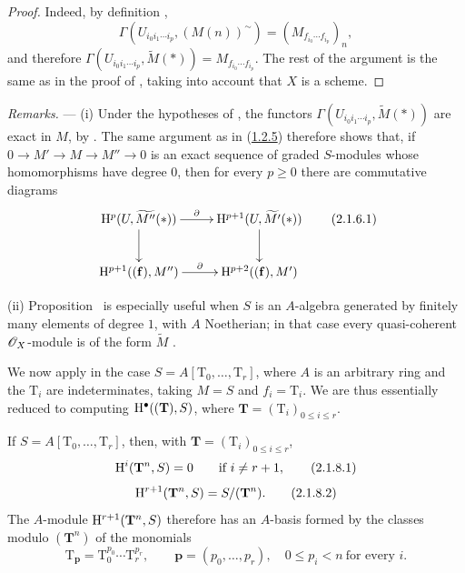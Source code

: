 \begin{proof}
Indeed, by definition ,
\[
  \Gamma(U_{i_0i_1\cdots i_p},(M(n))^\sim)
  =(M_{f_{i_0}\cdots f_{i_p}})_n,
\]
and therefore $\Gamma(U_{i_0i_1\cdots i_p},\widetilde{M}(*))=M_{f_{i_0}\cdots f_{i_p}}$.
The rest of the argument is the same as in the proof of , taking into account that $X$ is a scheme.
\end{proof}

\begin{env}[2.1.6]
\label{III.2.1.6}
\emph{Remarks.} ---
(i) Under the hypotheses of , the functors $\Gamma(U_{i_0i_1\cdots i_p},\widetilde{M}(*))$ are exact in $M$, by .
The same argument as in (\hyperref[III.1.2.5]{1.2.5}) therefore shows that, if $0\to M'\to M\to M''\to0$ is an exact sequence of graded $S$-modules whose homomorphisms have degree $0$, then for every $p\geq0$ there are commutative diagrams
\[
\label{III.2.1.6.1}
  \xymatrix{
    \HH^p(U,\widetilde{M''}(*)) \ar[r]^-\partial \ar[d] &
    \HH^{p+1}(U,\widetilde{M'}(*)) \ar[d] \\
    \HH^{p+1}((\mathbf{f}),M'') \ar[r]^-\partial &
    \HH^{p+2}((\mathbf{f}),M')
  }
  \tag{2.1.6.1}
\]

(ii) Proposition~ is especially useful when $S$ is an $A$-algebra generated by finitely many elements of degree $1$, with $A$ Noetherian; in that case every quasi-coherent $\mathscr{O}_X$-module is of the form $\widetilde{M}$ .
\end{env}

\begin{env}[2.1.7]
\label{III.2.1.7}
We now apply  in the case $S=A[\mathrm{T}_0,\dots,\mathrm{T}_r]$, where $A$ is an arbitrary ring and the $\mathrm{T}_i$ are indeterminates, taking $M=S$ and $f_i=\mathrm{T}_i$.
We are thus essentially reduced to computing $\mathrm{H}^\bullet((\mathbf{T}),S)$, where $\mathbf{T}=(\mathrm{T}_i)_{0\leq i\leq r}$.
\end{env}

\begin{lemma}[2.1.8]
\label{III.2.1.8}
If $S=A[\mathrm{T}_0,\dots,\mathrm{T}_r]$, then, with $\mathbf{T}=(\mathrm{T}_i)_{0\leq i\leq r}$,
\[
\label{III.2.1.8.1}
  \mathrm{H}^i(\mathbf{T}^n,S)=0
  \qquad\text{if }i\neq r+1,
  \tag{2.1.8.1}
\]
\[
\label{III.2.1.8.2}
  \mathrm{H}^{r+1}(\mathbf{T}^n,S)=S/(\mathbf{T}^n).
  \tag{2.1.8.2}
\]
The $A$-module $\mathrm{H}^{r+1}(\mathbf{T}^n,S)$ therefore has an $A$-basis formed by the classes modulo $(\mathbf{T}^n)$ of the monomials
\[
  \mathrm{T}_{\mathbf{p}}=\mathrm{T}_0^{p_0}\cdots\mathrm{T}_r^{p_r},
  \qquad \mathbf{p}=(p_0,\dots,p_r),\quad 0\leq p_i<n\ \text{for every }i.
\]
\end{lemma}


